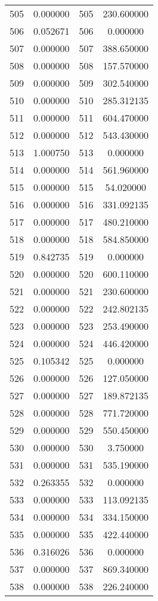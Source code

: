 \documentclass[12pt]{article}
\begin{document}
\begin{longtable}{@{}cccc@{}}
505 & 0.000000 & 505 & 230.600000 \\
506 & 0.052671 & 506 & 0.000000 \\
507 & 0.000000 & 507 & 388.650000 \\
508 & 0.000000 & 508 & 157.570000 \\
509 & 0.000000 & 509 & 302.540000 \\
510 & 0.000000 & 510 & 285.312135 \\
511 & 0.000000 & 511 & 604.470000 \\
512 & 0.000000 & 512 & 543.430000 \\
513 & 1.000750 & 513 & 0.000000 \\
514 & 0.000000 & 514 & 561.960000 \\
515 & 0.000000 & 515 & 54.020000 \\
516 & 0.000000 & 516 & 331.092135 \\
517 & 0.000000 & 517 & 480.210000 \\
518 & 0.000000 & 518 & 584.850000 \\
519 & 0.842735 & 519 & 0.000000 \\
520 & 0.000000 & 520 & 600.110000 \\
521 & 0.000000 & 521 & 230.600000 \\
522 & 0.000000 & 522 & 242.802135 \\
523 & 0.000000 & 523 & 253.490000 \\
524 & 0.000000 & 524 & 446.420000 \\
525 & 0.105342 & 525 & 0.000000 \\
526 & 0.000000 & 526 & 127.050000 \\
527 & 0.000000 & 527 & 189.872135 \\
528 & 0.000000 & 528 & 771.720000 \\
529 & 0.000000 & 529 & 550.450000 \\
530 & 0.000000 & 530 & 3.750000 \\
531 & 0.000000 & 531 & 535.190000 \\
532 & 0.263355 & 532 & 0.000000 \\
533 & 0.000000 & 533 & 113.092135 \\
534 & 0.000000 & 534 & 334.150000 \\
535 & 0.000000 & 535 & 422.440000 \\
536 & 0.316026 & 536 & 0.000000 \\
537 & 0.000000 & 537 & 869.340000 \\
538 & 0.000000 & 538 & 226.240000 \\

\end{longtable}
\end{document}
